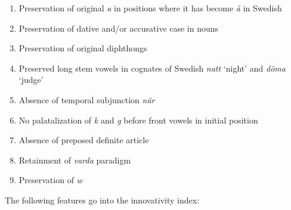 \begin{enumerate} %
\item 
Preservation of original \textit{a} in positions where it has become \textit{å} in Swedish

\item 
Preservation of dative and/or accusative case in nouns

\item 
Preservation of original diphthongs

\item 
Preserved long stem vowels in cognates of Swedish \textit{natt} ‘night’ and \textit{döma} ‘judge’

\item 
Absence of temporal subjunction \textit{när}

\item 
No palatalization of \textit{k} and \textit{g} before front vowels in initial position

\item 
Absence of preposed definite article

\item 
Retainment of \textit{varda} paradigm

\item 
Preservation of \textit{w}

\end{enumerate} %
The following features go into the innovativity index:


